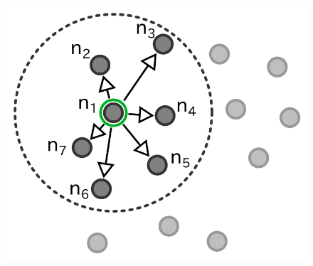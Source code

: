 \begin{figure}[!htb]
{				\includegraphics[scale=1.0]{figures/coordinator-3.png}
				\label{figure:Formation of fully meshed computation group - c}
			}%
			\hfill
			\\
			\subfloat[]{%
}
\end{figure}
